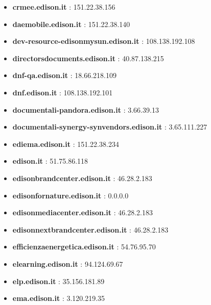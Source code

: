 \documentclass{article}
\begin{document}
\begin{itemize}
        \item \textbf{ crmee.edison.it }: 151.22.38.156
    
        \item \textbf{ daemobile.edison.it }: 151.22.38.140
    
        \item \textbf{ dev-resource-edisonmysun.edison.it }: 108.138.192.108
    
        \item \textbf{ directorsdocuments.edison.it }: 40.87.138.215
    
        \item \textbf{ dnf-qa.edison.it }: 18.66.218.109
    
        \item \textbf{ dnf.edison.it }: 108.138.192.101
    
        \item \textbf{ documentali-pandora.edison.it }: 3.66.39.13
    
        \item \textbf{ documentali-synergy-synvendors.edison.it }: 3.65.111.227
    
        \item \textbf{ ediema.edison.it }: 151.22.38.234
    
        \item \textbf{ edison.it }: 51.75.86.118
    
        \item \textbf{ edisonbrandcenter.edison.it }: 46.28.2.183
    
        \item \textbf{ edisonfornature.edison.it }: 0.0.0.0
    
        \item \textbf{ edisonmediacenter.edison.it }: 46.28.2.183
    
        \item \textbf{ edisonnextbrandcenter.edison.it }: 46.28.2.183
    
        \item \textbf{ efficienzaenergetica.edison.it }: 54.76.95.70
    
        \item \textbf{ elearning.edison.it }: 94.124.69.67
    
        \item \textbf{ elp.edison.it }: 35.156.181.89
    
        \item \textbf{ ema.edison.it }: 3.120.219.35
    

\end{itemize}
\end{document}
